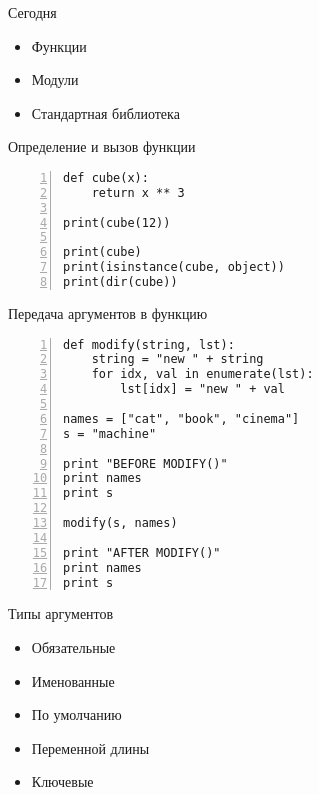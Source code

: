 \documentclass[hyperref={pdftex,unicode}]{beamer}
\begin{document}
\begin{frame}
  \maketitle
\end{frame}

\begin{frame}{Сегодня}
  \begin{itemize}
    \item Функции
    \item Модули
    \item Стандартная библиотека
  \end{itemize}
\end{frame}

\begin{frame}[fragile]{Определение и вызов функции}
    \begin{lstlisting}[numbers=left]
def cube(x):
    return x ** 3

print(cube(12))

print(cube)
print(isinstance(cube, object))
print(dir(cube))
    \end{lstlisting}
\end{frame}

\begin{frame}[fragile]{Передача аргументов в функцию}
      \begin{lstlisting}[numbers=left]
def modify(string, lst):
    string = "new " + string
    for idx, val in enumerate(lst):
        lst[idx] = "new " + val

names = ["cat", "book", "cinema"]
s = "machine"

print "BEFORE MODIFY()"
print names
print s

modify(s, names)

print "AFTER MODIFY()"
print names
print s
    \end{lstlisting}
\end{frame}

\begin{frame}{Типы аргументов}
  \begin{itemize}
  \item Обязательные
  \item Именованные
  \item По умолчанию
  \item Переменной длины
  \item Ключевые
  \end{itemize}
\end{frame}
\end{document}
